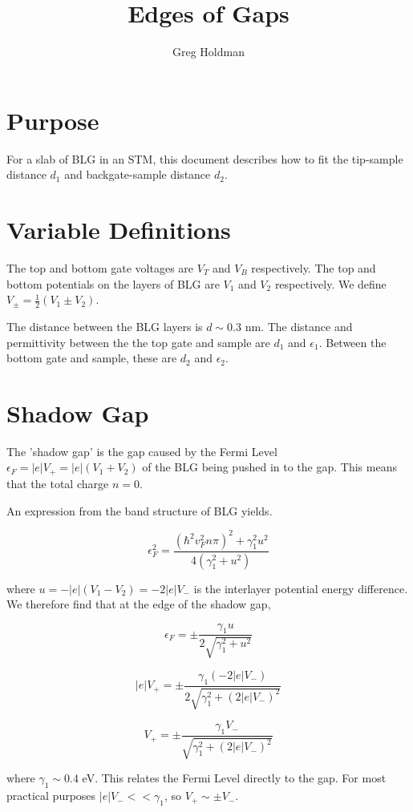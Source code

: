 \documentclass[11pt]{article}
\title{Edges of Gaps}
\author{Greg Holdman}
\begin{document}
\maketitle

\section{Purpose}

For a slab of BLG in an STM, this document describes how to fit the tip-sample distance $d_1$ and backgate-sample distance $d_2$.

\section{Variable Definitions}
The top and bottom gate voltages are $V_T$ and $V_B$ respectively. The top and bottom potentials on the layers of BLG are $V_1$ and $V_2$ respectively. We define $V_\pm = \frac{1}{2}(V_1\pm V_2)$.
 
The distance between the BLG layers is $d\sim 0.3$ nm. The distance and permittivity between the the top gate and sample are $d_1$ and $\epsilon_1$. Between the bottom gate and sample, these are $d_2$ and $\epsilon_2$.

\section{Shadow Gap}

The 'shadow gap' is the gap caused by the Fermi Level $\epsilon_F=|e|V_+=|e|(V_1+V_2)$ of the BLG being pushed in to the gap. This means that the total charge $n=0$.

An expression from the band structure of BLG yields.

$$\epsilon_F^2 = \frac{(\hbar^2v_F^2n\pi)^2 + \gamma_1^2u^2}{4(\gamma_1^2+u^2)}$$

where $u=-|e|(V_1-V_2)=-2|e|V_-$ is the interlayer potential energy difference. We therefore find that at the edge of the shadow gap,

$$\epsilon_F = \pm \frac{\gamma_1 u}{2\sqrt{\gamma_1^2+u^2}}$$

$$|e|V_+ = \pm \frac{\gamma_1 (-2|e|V_-)}{2\sqrt{\gamma_1^2+(2|e|V_-)^2}}$$

$$V_+ = \pm \frac{\gamma_1 V_-}{\sqrt{\gamma_1^2+(2|e|V_-)^2}}$$

where $\gamma_1\sim 0.4$ eV. This relates the Fermi Level directly to the gap. For most practical purposes $|e|V_- << \gamma_1$, so $V_+\sim \pm V_-$.
\end{document}
